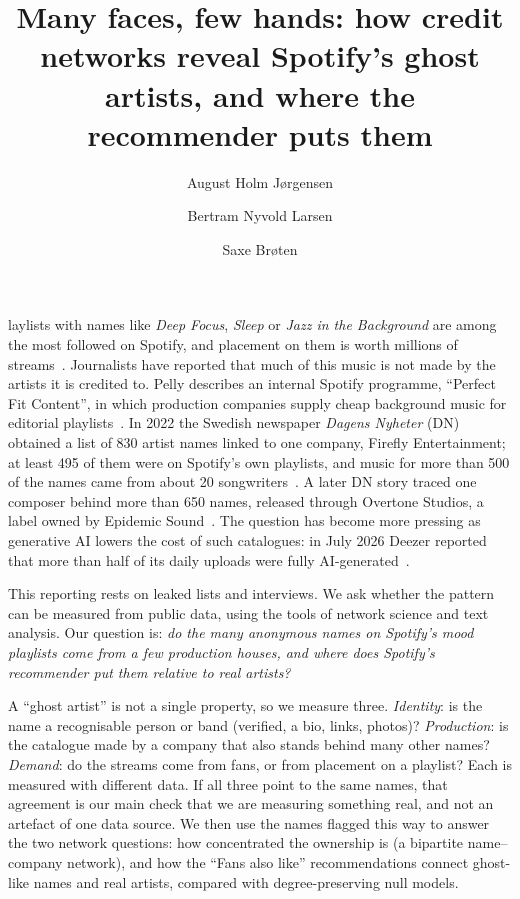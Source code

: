 \documentclass[9pt,twocolumn,twoside]{pnas-new}
\title{Many faces, few hands: how credit networks reveal Spotify's ghost artists, and where the recommender puts them}
\author[a]{August Holm J{\o}rgensen}
\author[a]{Bertram Nyvold Larsen}
\author[a]{Saxe Br{\o}ten}
\affil[a]{DTU Compute, Technical University of Denmark, 02805 Social Graphs and Interactions. Student IDs s224166, s224194, s224224.}
\begin{document}
\maketitle
\thispagestyle{firststyle}

laylists with names like \emph{Deep Focus}, \emph{Sleep} or \emph{Jazz in the Background} are among the most followed on Spotify, and placement on them is worth millions of streams~\cite{aguiar2021platforms,eriksson2019teardown}. Journalists have reported that much of this music is not made by the artists it is credited to. Pelly describes an internal Spotify programme, ``Perfect Fit Content'', in which production companies supply cheap background music for editorial playlists~\cite{pelly2025harpers,pelly2025mood}. In 2022 the Swedish newspaper \emph{Dagens Nyheter} (DN) obtained a list of 830 artist names linked to one company, Firefly Entertainment; at least 495 of them were on Spotify's own playlists, and music for more than 500 of the names came from about 20 songwriters~\cite{ingham2022mbw}. A later DN story traced one composer behind more than 650 names, released through Overtone Studios, a label owned by Epidemic Sound~\cite{stassen2024mbw}. The question has become more pressing as generative AI lowers the cost of such catalogues: in July 2026 Deezer reported that more than half of its daily uploads were fully AI-generated~\cite{techcrunch2026deezer}.

This reporting rests on leaked lists and interviews. We ask whether the pattern can be measured from public data, using the tools of network science and text analysis. Our question is: \emph{do the many anonymous names on Spotify's mood playlists come from a few production houses, and where does Spotify's recommender put them relative to real artists?}

A ``ghost artist'' is not a single property, so we measure three. \emph{Identity}: is the name a recognisable person or band (verified, a bio, links, photos)? \emph{Production}: is the catalogue made by a company that also stands behind many other names? \emph{Demand}: do the streams come from fans, or from placement on a playlist? Each is measured with different data. If all three point to the same names, that agreement is our main check that we are measuring something real, and not an artefact of one data source. We then use the names flagged this way to answer the two network questions: how concentrated the ownership is (a bipartite name--company network), and how the ``Fans also like'' recommendations connect ghost-like names and real artists, compared with degree-preserving null models.
\end{document}
